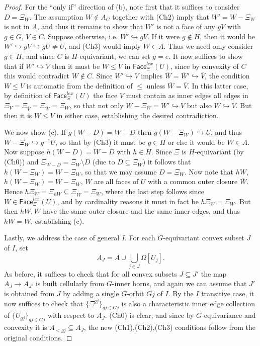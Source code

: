 \documentclass[a4paper,10pt
,draft
]{article}%
\begin{document}
\begin{proof}
For the ``only if'' direction of (b), 
note first that it suffices to consider $D = \Xi_W$.
The assumption $W \not \in A_C$ together with (Ch2) imply that
$W'=W-\Xi_{W}$ is not in $A$, and thus it remains to show that 
$W'$ is not a face of any $gV$ with $g\in G$, $V \in C$.
Suppose otherwise, i.e. $W' \hookrightarrow gV$.
If it were $g \not \in H$, 
then it would be $W' \hookrightarrow gV \hookrightarrow g U \neq U$, and (Ch3) would imply $W\in A$. Thus we need only consider $g\in H$, and since $C$ is $H$-equivariant, we can set $g=e$.
It now suffices to show that if $W' \hookrightarrow V$
then it must be $W \leq V$ in $\mathsf{Face}_{\Xi}^{lex}(U)$,
since by convexity of $C$ this would contradict $W \not \in C$.
Since $W' \hookrightarrow V$ implies 
$\bar{W} = \bar{W}' \hookrightarrow \bar{V}$,
the condition $W \leq V$ is automatic from the definition of $\leq$ unless $\bar{W} = \bar{V}$.
In this latter case, by definition of 
$\mathsf{Face}_{\Xi}^{lex}(U)$ the face $V$ must contain as inner edges all edges in 
$\Xi_V=\Xi_{\bar{V}} = \Xi_{\bar{W}} = \Xi_{W}$,
so that not only $W - \Xi_{W} = W' \hookrightarrow V$ but also $W \hookrightarrow V$. But then it is $W \leq V$ in either case, establishing the desired contradiction. 

We now show (c).
If $g(W-D)=W-D$ then $g(W - \Xi_W) \hookrightarrow U$,
and thus $W - \Xi_W \hookrightarrow g^{-1}U$,
so that by (Ch3) it must be $g \in H$ or else it would be $W \in A$.
Now suppose $h(W-D)=W-D$ with $h\in H$.
Since $\Xi$ is $H$-equivariant (by (Ch0)) and
$\Xi_{W-D} = \Xi_{W} \setminus D$ (due to $D \subseteq \Xi_{W}$) it follows that 
$h(W-\Xi_W)=W-\Xi_W$,
so that we may assume $D=\Xi_W$.
Now note that
$hW$, $h(W-\Xi_W)=W-\Xi_W$, $W$
are all faces of $U$ with a common outer closure $\bar{W}$.
Hence
$h\Xi_{W} = \Xi_{hW} \subseteq \Xi_{\bar{W}} = \Xi_{W}$, where the last step follows since
$W \in \mathsf{Face}_{\Xi}^{lex}(U)$, and by cardinality reasons it must in fact be $h \Xi_{W} = \Xi_{W}$. But then $hW,W$
have the same outer closure and the same inner edges, and thus 
$hW=W$, establishing (c).

Lastly, we address the case of general $I$.
For each $G$-equivariant convex subset $J$ of $I$, set
\[
	A_J = 
	A \cup \bigcup_{j \in J} \Omega[U_j].
\]
As before, it suffices to check that for all convex subsets
$J \subseteq J'$
the map $A_J \to A_{J'}$ is built cellularly from $G$-inner horns,
and again we can assume that $J'$ is obtained from $J$ by adding a single $G$-orbit $Gj$ of $I$.
By the $I$ transitive case, it now suffices to check that
$\{\Xi^{gj}\}_{gj \in Gj}$ is also a characteristic inner edge collection of $\{U_{g j}\}_{g j \in Gj}$ with respect to $A_J$.
(Ch0) is clear, and since by $G$-equivariance and convexity it is $A_{<gj} \subseteq A_J$,
the new (Ch1),(Ch2),(Ch3)
conditions follow from the original conditions.
\end{proof}
\end{document}
